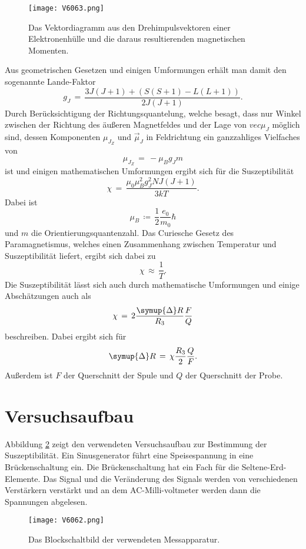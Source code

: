 \documentclass[
  bibliography=totoc,     %
  captions=tableheading,  %
  titlepage=firstiscover, %
]{scrartcl}
\begin{document}
\begin{figure}[H]
  \centering
  \texttt{[image: V6063.png]}
  \caption{Das Vektordiagramm aus den Drehimpulsvektoren einer Elektronenhülle und die daraus resultierenden magnetischen Momenten. \cite{anleitung}}
  \label{fig:V6061}
\end{figure}
\noindent
Aus geometrischen Gesetzen und einigen Umformungen erhält man damit den sogenannte Lande-Faktor
\begin{equation}
  g_J\,=\, \frac{3J(J+1)+ (S(S+1)-L(L+1))}{2J(J+1)}.
  \label{eqn:g_j}
\end{equation}
Durch Berücksichtigung der Richtungsquantelung, welche besagt, dass nur Winkel zwischen der Richtung des äußeren Magnetfeldes und der Lage von $vec{\mu_J}$ möglich sind, dessen Komponenten $\mu_{J_Z}$ und $\vec{\mu}_J$ in Feldrichtung ein ganzzahliges Vielfaches von
\begin{equation}
  \mu_{J_Z} \,=\,- \mu_B g_J m
  \label{eqn:mu}
\end{equation}
ist und einigen mathematischen Umformungen ergibt sich für die Suszeptibilität
\begin{equation}
  \chi \,=\, \frac{\mu_0 \mu_B^2 g_J^2 NJ(J+1)}{3kT}.
  \label{eqn:xi}
\end{equation}
Dabei ist
\begin{equation*}
  \mu_B\,\coloneq\,\frac{1}{2} \frac{e_0}{m_0} \hbar
\end{equation*}
und $m$ die Orientierungsquantenzahl.
Das Curiesche Gesetz des Paramagnetismus, welches einen Zusammenhang zwischen Temperatur und Suszeptibilität liefert, ergibt sich dabei zu
\begin{equation}
  \chi\,\approx\,\frac{1}{T}.
\end{equation}
Die Suszeptibilität lässt sich auch durch mathematische Umformungen und einige Abschätzungen auch als
\begin{equation}
  \chi\,=\,2\frac{\symup{\Delta}R}{R_3} \frac{F}{Q}
  \label{eqn:xi2}
\end{equation}
beschreiben. Dabei ergibt sich für
\begin{equation*}
  \symup{\Delta}R\,=\,\chi \frac{R_3}{2} \frac{Q}{F}.
\end{equation*}
Außerdem ist $F$ der Querschnitt der Spule und $Q$ der Querschnitt der Probe.

\section{Versuchsaufbau}
\label{sec:aufbau}
Abbildung \ref{fig:V6062} zeigt den verwendeten Versuchsaufbau zur Bestimmung der Suszeptibilität. Ein Sinusgenerator führt eine Speisespannung in eine Brückenschaltung ein. Die Brückenschaltung hat ein Fach für die Seltene-Erd-Elemente. Das Signal und die Veränderung des Signals werden von verschiedenen Verstärkern verstärkt und an dem AC-Milli-voltmeter werden dann die Spannungen abgelesen.
\begin{figure}[H]
  \centering
  \texttt{[image: V6062.png]}
  \caption{Das Blockschaltbild der verwendeten Messapparatur. \cite{anleitung}}
  \label{fig:V6062}
\end{figure}
\noindent
\end{document}
